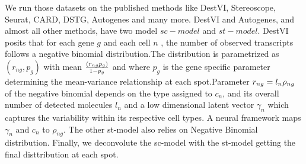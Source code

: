 \documentclass[16pt]{article}
\begin{document}
We run those datasets on the published methods like DestVI, Stereoscope, Seurat, CARD, DSTG, Autogenes and many more. DestVI and Autogenes, and almost all other methods, have two model $sc-model$ and $st- model$. DestVI posits that for each gene $g$ and each cell $n$ , the number of observed transcripts follows a negative binomial distribution.The distribution is parametrized as $(r_{ng},p_{g})$ with mean $\frac{(r_{ng}\* p_{g})}{1-p_{g}}$ and where $p_{g}$ is the gene specific parameter determining the mean-variance relationship at each spot.Parameter $r_{ng}=l_{n}\*\rho_{ng}$ of the negative binomial depends on the type assigned to $c_{n}$, and its overall number of detected molecules $l_{n}$ and a low dimensional latent vector $\gamma_{n}$ which captures the variability within its respective cell types. A neural framework maps $\gamma_{n}$ and $c_{n}$ to $\rho_{ng}$. The other st-model also relies on Negative Binomial distribution. Finally, we deconvolute the sc-model with the st-model getting the final disttribution at each spot.
\vfill
\end{document}
